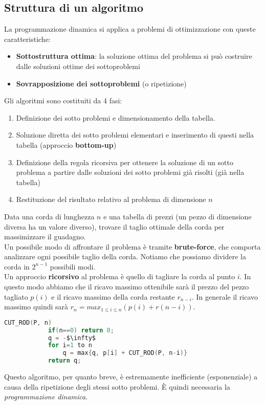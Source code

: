 \subsection{Struttura di un algoritmo }
La programmazione dinamica si applica a problemi di ottimizzazione con queste caratteristiche:
\begin{itemize}
	\item \textbf{Sottostruttura ottima}: la soluzione ottima del problema si può costruire dalle soluzioni ottime dei sottoproblemi
	\item \textbf{Sovrapposizione dei sottoproblemi} (o ripetizione)
\end{itemize}
Gli algoritmi sono costituiti da 4 fasi:
\begin{enumerate}
	\item Definizione dei sotto problemi e dimensionamento della tabella.
	\item Soluzione diretta dei sotto problemi elementari e inserimento di questi nella tabella (approccio \textbf{bottom-up})
	\item Definizione della regola ricorsiva per ottenere la soluzione di un sotto problema a partire dalle soluzioni dei sotto problemi già risolti (già nella tabella)
	\item Restituzione del risultato relativo al problema di dimensione $n$
\end{enumerate}

\begin{example}
	Data una corda di lunghezza $n$ e una tabella di prezzi (un pezzo di dimensione diversa ha un valore diverso), trovare il taglio ottimale della corda per massimizzare il guadagno.\\
	Un possibile modo di affrontare il problema è tramite \textbf{brute-force}, che comporta analizzare ogni possibile taglio della corda. Notiamo che possiamo dividere la corda in $2^{n -1}$ possibili modi.\\
	Un approccio \textbf{ricorsivo} al problema è quello di tagliare la corda al punto $i$. In questo modo abbiamo che il ricavo massimo ottenibile sarà il prezzo del pezzo tagliato $p(i)$ e il ricavo massimo della corda restante $r_{n-i}$. In generale il ricavo massimo quindi sarà $r_n = max_{1 \leq i \leq n}(p(i)+r(n-i))$.
	\begin{lstlisting}[language=C, caption=Taglio della corda, mathescape=true]
		CUT_ROD(P, n)
			if(n==0) return 0;
			q = -$\infty$
			for i=1 to n
				q = max{q, p[i] + CUT_ROD(P, n-i)}
			return q;
	\end{lstlisting}
	Questo algoritmo, per quanto breve, è estremamente inefficiente (esponenziale) a causa della ripetizione degli stessi sotto problemi. È quindi necessaria la \emph{programmazione dinamica}.
\end{example}